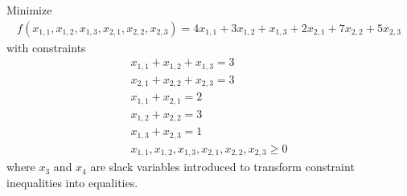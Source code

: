 \documentclass[11pt]{article}
\begin{document}
\begin{sol}
Minimize 
\begin{eqnarray*}
f(x_{1,1},x_{1,2},x_{1,3},x_{2,1},x_{2,2},x_{2,3}) = 4x_{1,1} + 3x_{1,2} + x_{1,3} + 2x_{2,1} + 7x_{2,2} + 5x_{2,3}
\end{eqnarray*}
with constraints 
\begin{eqnarray*}
x_{1,1} + x_{1,2} + x_{1,3} = 3 \\
x_{2,1} + x_{2,2} + x_{2,3} = 3 \\
x_{1,1} + x_{2,1} = 2 \\
x_{1,2} + x_{2,2} = 3 \\
x_{1,3} + x_{2,3} = 1 \\
x_{1,1}, x_{1,2}, x_{1,3}, x_{2,1}, x_{2,2}, x_{2,3} \geq 0 
\end{eqnarray*}
where $x_{3}$ and $x_{4}$ are slack variables introduced to transform constraint inequalities into equalities.
\end{sol}
\end{document}
